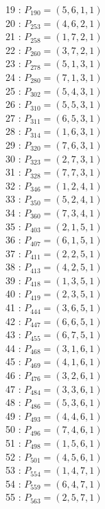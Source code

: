 \documentclass{article}
\begin{document}
{\begin{multicols}{2}
19 : $P_{190}=( 5, 6, 1, 1 )$\\
20 : $P_{253}=( 4, 6, 2, 1 )$\\
21 : $P_{258}=( 1, 7, 2, 1 )$\\
22 : $P_{260}=( 3, 7, 2, 1 )$\\
23 : $P_{278}=( 5, 1, 3, 1 )$\\
24 : $P_{280}=( 7, 1, 3, 1 )$\\
25 : $P_{302}=( 5, 4, 3, 1 )$\\
26 : $P_{310}=( 5, 5, 3, 1 )$\\
27 : $P_{311}=( 6, 5, 3, 1 )$\\
28 : $P_{314}=( 1, 6, 3, 1 )$\\
29 : $P_{320}=( 7, 6, 3, 1 )$\\
30 : $P_{323}=( 2, 7, 3, 1 )$\\
31 : $P_{328}=( 7, 7, 3, 1 )$\\
32 : $P_{346}=( 1, 2, 4, 1 )$\\
33 : $P_{350}=( 5, 2, 4, 1 )$\\
34 : $P_{360}=( 7, 3, 4, 1 )$\\
35 : $P_{403}=( 2, 1, 5, 1 )$\\
36 : $P_{407}=( 6, 1, 5, 1 )$\\
37 : $P_{411}=( 2, 2, 5, 1 )$\\
38 : $P_{413}=( 4, 2, 5, 1 )$\\
39 : $P_{418}=( 1, 3, 5, 1 )$\\
40 : $P_{419}=( 2, 3, 5, 1 )$\\
41 : $P_{444}=( 3, 6, 5, 1 )$\\
42 : $P_{447}=( 6, 6, 5, 1 )$\\
43 : $P_{455}=( 6, 7, 5, 1 )$\\
44 : $P_{468}=( 3, 1, 6, 1 )$\\
45 : $P_{469}=( 4, 1, 6, 1 )$\\
46 : $P_{476}=( 3, 2, 6, 1 )$\\
47 : $P_{484}=( 3, 3, 6, 1 )$\\
48 : $P_{486}=( 5, 3, 6, 1 )$\\
49 : $P_{493}=( 4, 4, 6, 1 )$\\
50 : $P_{496}=( 7, 4, 6, 1 )$\\
51 : $P_{498}=( 1, 5, 6, 1 )$\\
52 : $P_{501}=( 4, 5, 6, 1 )$\\
53 : $P_{554}=( 1, 4, 7, 1 )$\\
54 : $P_{559}=( 6, 4, 7, 1 )$\\
55 : $P_{563}=( 2, 5, 7, 1 )$\\
\end{multicols}
}
\end{document}
